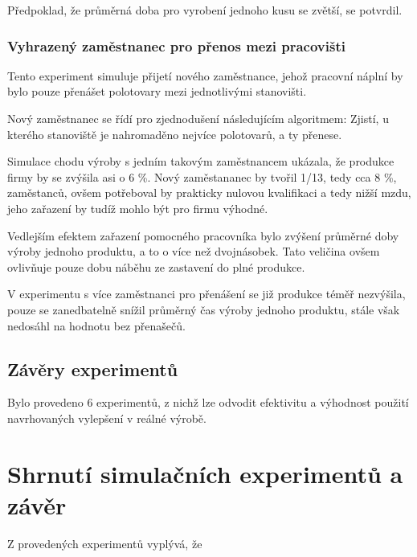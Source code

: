 \documentclass[11pt, a4paper]{article}
\begin{document}
Předpoklad, že průměrná doba pro vyrobení jednoho kusu se zvětší, se potvrdil.


\subsubsection{Vyhrazený zaměstnanec pro přenos mezi pracovišti}
Tento experiment simuluje přijetí nového zaměstnance, jehož pracovní náplní by bylo pouze přenášet polotovary mezi jednotlivými stanovišti.

Nový zaměstnanec se řídí pro zjednodušení následujícím algoritmem: Zjistí, u kterého stanoviště je nahromaděno nejvíce polotovarů, a ty přenese.

Simulace chodu výroby s jedním takovým zaměstnancem ukázala, že produkce firmy by se zvýšila asi o 6 \%. Nový zaměstananec by tvořil 1/13, tedy cca 8 \%, zaměstanců, ovšem potřeboval by prakticky nulovou kvalifikaci a tedy nižší mzdu, jeho zařazení by tudíž mohlo být pro firmu výhodné.

Vedlejším efektem zařazení pomocného pracovníka bylo zvýšení průměrné doby výroby jednoho produktu, a to o více než dvojnásobek. Tato veličina ovšem ovlivňuje pouze dobu náběhu ze zastavení do plné produkce.


V experimentu s více zaměstnanci pro přenášení se již produkce téměř nezvýšila, pouze se zanedbatelně snížil průměrný čas výroby jednoho produktu, stále však nedosáhl na hodnotu bez přenašečů.

\subsection{Závěry experimentů}
Bylo provedeno 6 experimentů, z nichž lze odvodit efektivitu a výhodnost použití navrhovaných vylepšení v reálné výrobě.

\section{Shrnutí simulačních experimentů a závěr}
Z provedených experimentů vyplývá, že

\newpage


\end{document}
